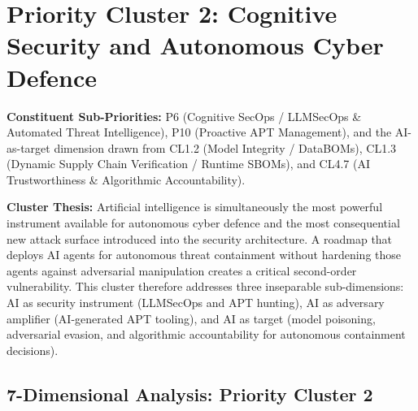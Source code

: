 
\newpage
\section{Priority Cluster 2: Cognitive Security and Autonomous Cyber Defence}
\label{sec:cluster2}

\noindent\textbf{Constituent Sub-Priorities:} P6 (Cognitive SecOps / LLMSecOps \& Automated
Threat Intelligence), P10 (Proactive APT Management), and the AI-as-target dimension
drawn from CL1.2 (Model Integrity / DataBOMs), CL1.3 (Dynamic Supply Chain Verification /
Runtime SBOMs), and CL4.7 (AI Trustworthiness \& Algorithmic Accountability).

\medskip
\noindent\textbf{Cluster Thesis:} Artificial intelligence is simultaneously the most powerful
instrument available for autonomous cyber defence and the most consequential new attack surface
introduced into the security architecture. A roadmap that deploys AI agents for autonomous
threat containment without hardening those agents against adversarial manipulation creates a
critical second-order vulnerability. This cluster therefore addresses three inseparable
sub-dimensions: AI as security instrument (LLMSecOps and APT hunting), AI as adversary
amplifier (AI-generated APT tooling), and AI as target (model poisoning, adversarial evasion,
and algorithmic accountability for autonomous containment decisions).

\subsection*{7-Dimensional Analysis: Priority Cluster 2}

